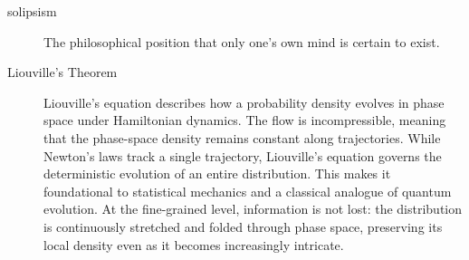 {\begin{description}
    \item[solipsism] The philosophical position that only one's own mind is certain to exist. 
    

    \item[Liouville's Theorem] Liouville’s equation describes how a probability density evolves in phase space under Hamiltonian dynamics. The flow is incompressible, meaning that the phase-space density remains constant along trajectories. While Newton’s laws track a single trajectory, Liouville’s equation governs the deterministic evolution of an entire distribution. This makes it foundational to statistical mechanics and a classical analogue of quantum evolution. At the fine-grained level, information is not lost: the distribution is continuously stretched and folded through phase space, preserving its local density even as it becomes increasingly intricate.
      
    \end{description}
}


